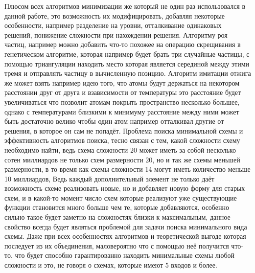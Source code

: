 \documentclass[14pt]{extarticle} %
\begin{document}
Плюсом всех алгоритмов минимизации же который не один раз использовался в данной работе, это возможность их модифицировать, добавляя некоторые особенности, например разделение на уровни, отталкивание одинаковых решений, понижение сложности при нахождении решения. Алгоритму роя частиц, например можно добавить что-то похожее на операцию скрещивания в генетическом алгоритме, которая например будет брать три случайные частицы, с помощью триангуляции находить место которая является серединой между этими тремя и отправлять частицу в вычисленную позицию. Алгоритм имитации отжига же может взять например идею того, что атомы будут держаться на некотором расстоянии друг от друга и взависимости  от температуры это расстояние будет увеличиваться что позволит атомам покрыть пространство несколько большее, однако с температурами близкими к минимуму расстояние между ними может быть достаточно велико чтобы один атом например отталкивал другие от решения, в которое он сам не попадёт.
Проблема поиска минимальной схемы и эффективность алгоритмов поиска, тесно связан с тем, какой сложности схему необходимо найти, ведь схема сложности 20 может иметь за собой несколько сотен миллиардов не только схем размерности 20, но и так же схемы меньшей размерности, в то время как схемы сложности 14 могут иметь количество меньше 10 миллиардов, Ведь каждый дополнительный элемент не только даёт возможность схеме реализовать новые, но и добавляет новую форму для старых схем, и в какой-то момент число схем которые реализуют уже существующие функции становится много больше чем те, которые добавляются, особенно сильно такое будет заметно на сложностях близки к максимальным, данное свойство всегда будет являться проблемой для задачи поиска минимального вида схемы. Даже при всех особенностях алгоритмов и  теоретической выгоде которая последует из их объединения, маловероятно что с помощью неё получится что-то, что будет способно гарантированно находить минимальные схемы любой сложности и это, не говоря о схемах, которые имеют 5 входов и более.


\end{document}
